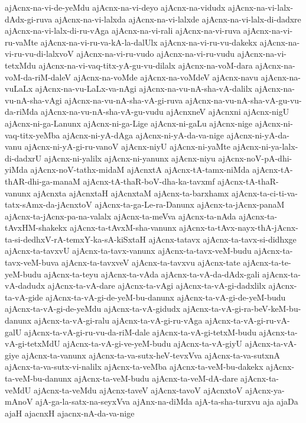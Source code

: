 {ajAcnx-na-vi-de-yeMdu
ajAcnx-na-vi-deyo
ajAcnx-na-vidudx
ajAcnx-na-vi-lalx-dAdx-gi-ruva
ajAcnx-na-vi-lalxda
ajAcnx-na-vi-lalxde
ajAcnx-na-vi-lalx-di-dadxre
ajAcnx-na-vi-lalx-di-ru-vAga
ajAcnx-na-vi-rali
ajAcnx-na-vi-ruva
ajAcnx-na-vi-ru-vaMte
ajAcnx-na-vi-ru-va-kA-la-dalUlx
ajAcnx-na-vi-ru-vu-dakekx
ajAcnx-na-vi-ru-vu-di-lalxvoV
ajAcnx-na-vi-ru-vudo
ajAcnx-na-vi-ru-vudu
ajAcnx-na-vi-tetxMdu
ajAcnx-na-vi-vaq-titx-yA-gu-vu-dilalx
ajAcnx-na-voM-dara
ajAcnx-na-voM-da-riM-daleV
ajAcnx-na-voMde
ajAcnx-na-voMdeV
ajAcnx-navu
ajAcnx-na-vuLaLx
ajAcnx-na-vu-LaLx-va-nAgi
ajAcnx-na-vu-nA-sha-vA-dalilx
ajAcnx-na-vu-nA-sha-vAgi
ajAcnx-na-vu-nA-sha-vA-gi-ruva
ajAcnx-na-vu-nA-sha-vA-gu-vu-da-riMda
ajAcnx-na-vu-nA-sha-vA-gu-vudu
ajAcnxneV
ajAcnxni
ajAcnx-nigU
ajAcnx-ni-ga-Lanunx
ajAcnx-ni-ga-Lige
ajAcnx-ni-gaLu
ajAcnx-nige
ajAcnx-ni-vaq-titx-yeMba
ajAcnx-ni-yA-dAga
ajAcnx-ni-yA-da-va-nige
ajAcnx-ni-yA-da-vanu
ajAcnx-ni-yA-gi-ru-vanoV
ajAcnx-niyU
ajAcnx-ni-yaMte
ajAcnx-ni-ya-lalx-di-dadxrU
ajAcnx-ni-yalilx
ajAcnx-ni-yanunx
ajAcnx-niyu
ajAcnx-noV-pA-dhi-yiMda
ajAcnx-noV-tathx-midaM
ajAcnxtA
ajAcnx-tA-tamx-niMda
ajAcnx-tA-thAR-dhi-ga-manaM
ajAcnx-tA-thaR-boV-dha-ka-tavxmf
ajAcnx-tA-thaR-vanunx
ajAcnxta
ajAcnxtaH
ajAcnxtaM
ajAcnx-ta-barxhamx
ajAcnx-ta-ci-ti-va-tatx-sAmx-da-jAcnxtoV
ajAcnx-ta-ga-Le-ra-Danunx
ajAcnx-ta-jAcnx-panaM
ajAcnx-ta-jAcnx-pa-na-valalx
ajAcnx-ta-meVva
ajAcnx-ta-nAda
ajAcnx-ta-tAvxHM-shakekx
ajAcnx-ta-tAvxM-sha-vanunx
ajAcnx-ta-tAvx-nayx-thA-jAcnx-ta-si-dedhxV-rA-temxY-ka-sA-kiSxtaH
ajAcnx-tatavx
ajAcnx-ta-tavx-si-didhxge
ajAcnx-ta-tavxvU
ajAcnx-ta-tavx-vanunx
ajAcnx-ta-tavx-veM-budu
ajAcnx-ta-tavx-veM-buva
ajAcnx-ta-tavxveV
ajAcnx-ta-tavxvu
ajAcnx-tate
ajAcnx-ta-te-yeM-budu
ajAcnx-ta-teyu
ajAcnx-ta-vAda
ajAcnx-ta-vA-da-dAdx-gali
ajAcnx-ta-vA-dadudx
ajAcnx-ta-vA-dare
ajAcnx-ta-vAgi
ajAcnx-ta-vA-gi-dadxlilx
ajAcnx-ta-vA-gide
ajAcnx-ta-vA-gi-de-yeM-bu-danunx
ajAcnx-ta-vA-gi-de-yeM-budu
ajAcnx-ta-vA-gi-de-yeMdu
ajAcnx-ta-vA-gidudx
ajAcnx-ta-vA-gi-ra-beV-keM-bu-danunx
ajAcnx-ta-vA-gi-ralu
ajAcnx-ta-vA-gi-ru-vAga
ajAcnx-ta-vA-gi-ru-vA-galU
ajAcnx-ta-vA-gi-ru-vu-da-riM-dale
ajAcnx-ta-vA-gi-tetxM-budu
ajAcnx-ta-vA-gi-tetxMdU
ajAcnx-ta-vA-gi-ve-yeM-budu
ajAcnx-ta-vA-giyU
ajAcnx-ta-vA-giye
ajAcnx-ta-vanunx
ajAcnx-ta-va-sutx-heV-tevxVva
ajAcnx-ta-va-sutxnA
ajAcnx-ta-va-sutx-vi-nalilx
ajAcnx-ta-veMba
ajAcnx-ta-veM-bu-dakekx
ajAcnx-ta-veM-bu-danunx
ajAcnx-ta-veM-budu
ajAcnx-ta-veM-dA-dare
ajAcnx-ta-veMdU
ajAcnx-ta-veMdu
ajAcnx-taveV
ajAcnx-tavoV
ajAcnxtoV
ajAcnx-ya-mAnoV
ajA-ga-la-satx-na-seyxVva
ajAnx-na-diMda
ajA-ta-sha-turxvu
aja
ajaDa
ajaH
ajacnxH
ajacnx-nA-da-va-nige
}
